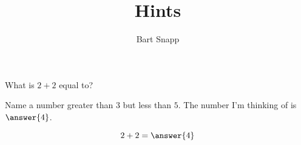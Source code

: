 \documentclass{ximera}
\title[Examples:]{Hints}
\author{Bart Snapp}
\begin{document}
\begin{abstract}
\end{abstract}
\maketitle

\begin{problem}
  What is $2+2$ equal to?
  \begin{hint}
    Name a number greater than $3$ but less than $5$. The number I'm
    thinking of is $\answer{4}$.
  \end{hint}
  \[
  2+2 = \answer{4}
  \]
\end{problem}
\end{document}
